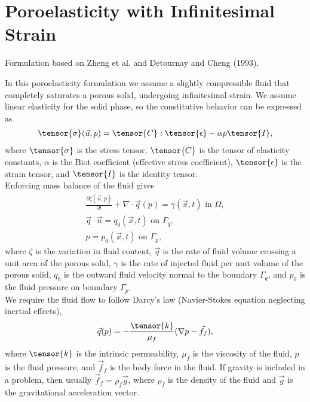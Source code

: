 \section{Poroelasticity with Infinitesimal Strain}

Formulation based on Zheng et al. and Detournay and Cheng (1993).

In this poroelasticity formulation we assume a slightly compressible fluid that
completely saturates a porous solid, undergoing infinitesimal
strain. We assume linear elasticity for the solid phase, so the constitutive behavior can be expressed
as
\begin{gather}
  \tensor{\sigma}(\vec{u},p) = \tensor{C} : \tensor{\epsilon} - \alpha p \tensor{I},
\end{gather}
where $\tensor{\sigma}$ is the stress tensor, $\tensor{C}$ is the
tensor of elasticity constants, $\alpha$ is the Biot coefficient
(effective stress coefficient), $\tensor{\epsilon}$ is the strain
tensor, and $\tensor{I}$ is the identity tensor.\\

Enforcing mass balance of the fluid gives
\begin{gather}
  \frac{\partial \zeta(\vec{u},p)}{\partial t} + \nabla \cdot \vec{q}(p) =
\gamma(\vec{x},t) \text{ in }
\Omega, \\
%
  \vec{q} \cdot \vec{n} = q_0(\vec{x},t) \text{ on }\Gamma_q, \\
%
  p = p_0(\vec{x},t) \text{ on }\Gamma_p,
\end{gather}
where $\zeta$ is the variation in fluid content, $\vec{q}$ is the rate
of fluid volume crossing a unit area of the porous solid, $\gamma$ is
the rate of injected fluid per unit volume of the porous solid, $q_0$
is the outward fluid velocity normal to the boundary $\Gamma_q$, and
$p_0$ is the fluid pressure on boundary $\Gamma_p$.\\

We require the fluid flow to follow Darcy's law (Navier-Stokes equation neglecting inertial
effects),
\begin{gather}
  \vec{q}(p) = -\frac{\tensor{k}}{\mu_{f}}(\nabla p - \vec{f}_f), \\
\end{gather}
where $\tensor{k}$ is the intrinsic permeability, $\mu_f$ is the viscosity of the
fluid, $p$ is the fluid pressure, and $\vec{f}_f$ is the body force
in the fluid. If gravity is included in a problem, then usually
$\vec{f}_f = \rho_f \vec{g}$, where $\rho_f$ is the density of the
fluid and $\vec{g}$ is the gravitational acceleration vector.\\


